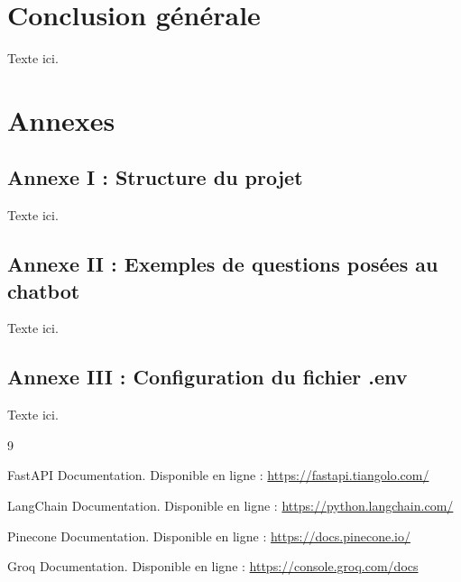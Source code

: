 \documentclass[12pt, a4paper, twoside]{report}
\begin{document}
\chapter*{Conclusion générale}
Texte ici.

\chapter*{Annexes}

\section*{Annexe I : Structure du projet}
Texte ici.

\section*{Annexe II : Exemples de questions posées au chatbot}
Texte ici.

\section*{Annexe III : Configuration du fichier .env}
Texte ici.

\begin{thebibliography}{9}

FastAPI Documentation. Disponible en ligne : \url{https://fastapi.tiangolo.com/}

LangChain Documentation. Disponible en ligne : \url{https://python.langchain.com/}

Pinecone Documentation. Disponible en ligne : \url{https://docs.pinecone.io/}

Groq Documentation. Disponible en ligne : \url{https://console.groq.com/docs}

\end{thebibliography}
\end{document}
